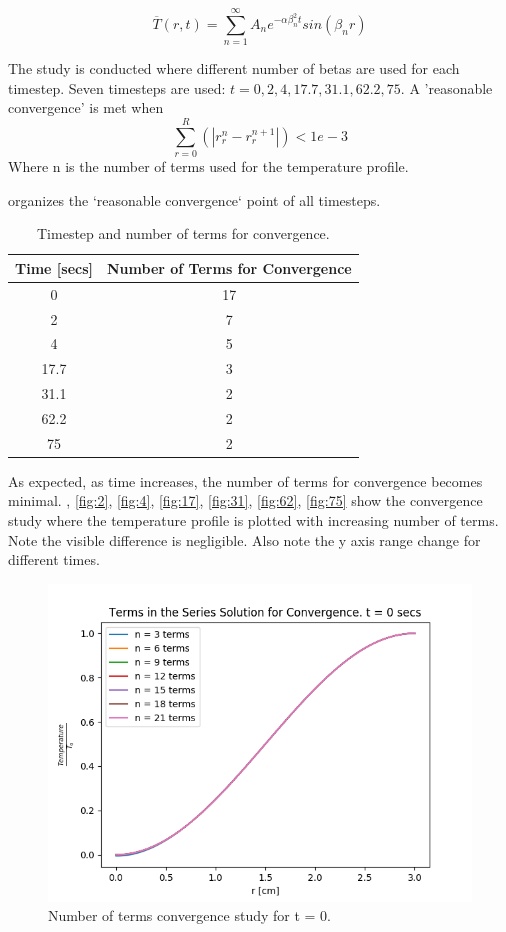 \documentclass[12pt,letterpaper]{article}
\begin{document}
\[\overline{T}(r,t) = \sum_{n=1}^{\infty} A_n e^{-\alpha \beta_n^2 t} sin(\beta_n r)\]

The study is conducted where different number of betas are used for each timestep.
Seven timesteps are used: $t = 0, 2, 4, 17.7, 31.1, 62.2, 75$.
A 'reasonable convergence' is met when $$ \sum_{r=0}^{R} (|r_{r}^n - r_{r}^{n+1}|) < 1e-3$$
Where n is the number of terms used for the temperature profile.

 organizes the `reasonable convergence` point of all timesteps.

\begin{table}[h]
     \centering
    \begin{tabular}{cc}
       \hline
       \textbf{Time [secs]} & \textbf{Number of Terms for Convergence}  \\
       \hline
       0 & 17 \\
       2 & 7 \\
       4 & 5 \\
       17.7 & 3 \\
       31.1 & 2 \\
       62.2 & 2 \\
       75 & 2 \\
       \hline
    \end{tabular}
    \caption {Timestep and number of terms for convergence.}
    \label{tab:conv}
\end{table}


As expected, as time increases, the number of terms for convergence
becomes minimal. 
, \ref{fig:2}, \ref{fig:4}, \ref{fig:17}, \ref{fig:31}, \ref{fig:62}, \ref{fig:75} show the 
convergence study where the temperature profile is plotted with
increasing number of terms. Note the visible difference is negligible.
Also note the y axis range change for different times.


\begin{figure}[htbp!]
  \begin{center}
    \includegraphics[scale=0.7]{terms_0.png}
  \end{center}
  \caption{Number of terms convergence study for t = 0.}
  \label{fig:0}
\end{figure}
\end{document}
